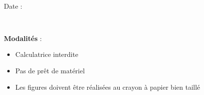 \documentclass[a4paper,11pt,fleqn]{article}
\begin{document}
\setcounter{pagecounter}{0}
\setcounter{ExoMA}{0}
\setcounter{prof}{0}

\def\points{\phantom{AAA}}
\def\difficulty{\phantom{AAA}}


\vspace{-0.2cm}
\begin{minipage}[t]{0.5\textwidth}%
    \printcompindex
\end{minipage}
\hfill
\begin{minipage}[t]{0.415\textwidth}
    \begin{minipage}[t]{0.75\textwidth}
        \phantom{a}\\
        Date : \repsim[3.5cm]{}\hfill \vrule \hfill {}
    \end{minipage}\\
    \begin{minipage}[t]{\textwidth}
        \textbf{Modalités} :
        \begin{itemize}[label=$\bullet$]
            \item Calculatrice interdite%
            \item Pas de prêt de matériel
            \item Les figures doivent être réalisées au crayon à papier bien taillé
        \end{itemize}
    \end{minipage}
\end{minipage}


\newpage
\setcounter{pagecounter}{0}
\setcounter{ExoMA}{0}
\setcounter{prof}{1}


\end{document}
